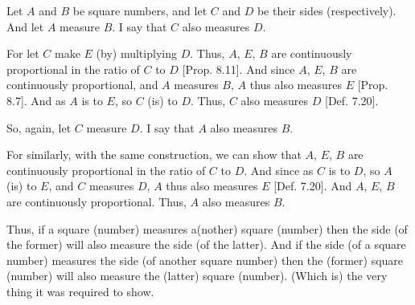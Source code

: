 \begin{Parallel}{}{}
{Let $A$ and $B$ be square numbers, and let $C$ and $D$ be their sides (respectively). And let $A$ measure $B$. I say that $C$ also measures $D$.

\epsfysize=1in
\centerline{}

For let $C$ make $E$ (by) multiplying $D$. Thus, $A$, $E$, $B$
are continuously proportional in the ratio of $C$ to $D$
[Prop. 8.11]. And since $A$, $E$, $B$ are
continuously proportional, and $A$ measures $B$, $A$ thus also
measures $E$ [Prop. 8.7]. And as $A$ is to $E$,
so $C$ (is) to $D$. Thus, $C$ also measures $D$ [Def. 7.20].

So, again, let $C$ measure $D$. I say that $A$ also measures $B$.

For similarly, with the same construction, we can show that $A$, $E$, $B$
are continuously proportional in the ratio of $C$ to $D$. And since as $C$
is to $D$, so $A$ (is) to $E$, and $C$ measures $D$, $A$ thus
also measures $E$ [Def. 7.20]. And $A$, $E$,
$B$ are continuously proportional. Thus, $A$ also measures $B$.

Thus, if a square (number) measures a(nother) square
(number) then the side (of the former) will also measure the
side (of the latter). And if the side (of a square number) measures the side
(of another square number) then the (former) square (number) will also
measure the (latter) square (number). (Which is) the very thing it was
required to show.}
\end{Parallel}

